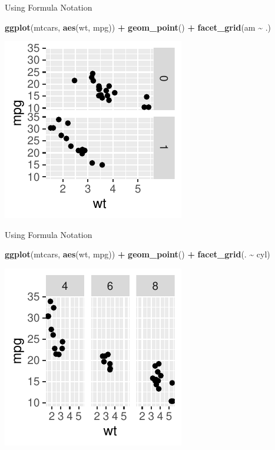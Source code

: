 \documentclass[
  ignorenonframetext,
]{beamer}
\newenvironment{Shaded}{\begin{snugshade}}{\end{snugshade}}
\newcommand{\FunctionTok}[1]{\textcolor[rgb]{0.13,0.29,0.53}{\textbf{#1}}}
\newcommand{\NormalTok}[1]{#1}
\newcommand{\SpecialCharTok}[1]{\textcolor[rgb]{0.81,0.36,0.00}{\textbf{#1}}}
\begin{document}
\begin{frame}[fragile]{Using Formula Notation}
\label{using-formula-notation}

\begin{Shaded}
\begin{Highlighting}[]
\FunctionTok{ggplot}\NormalTok{(mtcars, }\FunctionTok{aes}\NormalTok{(wt, mpg)) }\SpecialCharTok{+} \FunctionTok{geom\_point}\NormalTok{() }\SpecialCharTok{+} \FunctionTok{facet\_grid}\NormalTok{(am }\SpecialCharTok{\textasciitilde{}}
\NormalTok{    .)}
\end{Highlighting}
\end{Shaded}

\begin{center}\includegraphics[width=0.5\linewidth]{Figs/unnamed-chunk-79-1} \end{center}
\end{frame}

\begin{frame}[fragile]{Using Formula Notation}
\label{using-formula-notation-1}

\begin{Shaded}
\begin{Highlighting}[]
\FunctionTok{ggplot}\NormalTok{(mtcars, }\FunctionTok{aes}\NormalTok{(wt, mpg)) }\SpecialCharTok{+} \FunctionTok{geom\_point}\NormalTok{() }\SpecialCharTok{+} \FunctionTok{facet\_grid}\NormalTok{(. }\SpecialCharTok{\textasciitilde{}}
\NormalTok{    cyl)}
\end{Highlighting}
\end{Shaded}

\begin{center}\includegraphics[width=0.5\linewidth]{Figs/unnamed-chunk-80-1} \end{center}
\end{frame}
\end{document}
